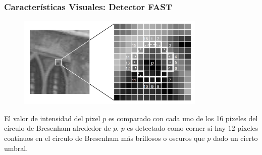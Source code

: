 \begin{frame}
	\frametitle{Características Visuales: Detector FAST}
	
	\begin{figure}
		\includegraphics[width=0.8\textwidth]{./images/camera/fast}
	\end{figure}
	
	El valor de intensidad del pixel $p$ es comparado con cada uno de los 16 pixeles del círculo de Bresenham alrededor de $p$. $p$ es detectado como corner si hay $12$ píxeles continuos en el circulo de Bresenham más brillosos o oscuros que $p$ dado un cierto umbral.
\end{frame}

